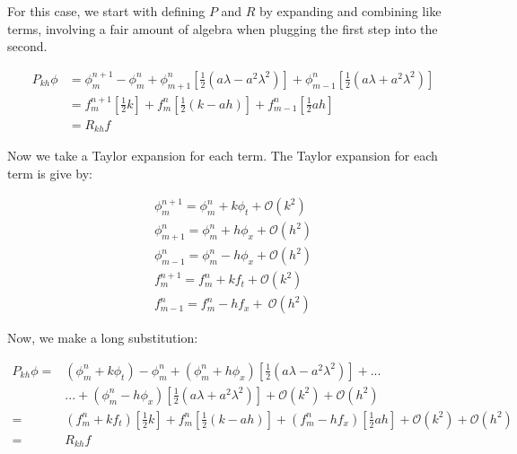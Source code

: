 \documentclass[12pt]{article}
\begin{document}
For this case, we start with defining $P$ and $R$ by expanding and combining like terms, involving a fair amount of algebra when plugging the first step into the second.

\begin{equation*}
    \begin{aligned}
    P_{kh}\phi & = \phi_m^{n+1} - 
    \phi_{m}^{n} + 
    \phi_{m+1}^{n}\left[\frac{1}{2}(a\lambda - a^2\lambda^2 )\right] + 
    \phi_{m-1}^{n}\left[\frac{1}{2}(a\lambda + a^2\lambda^2)\right] \\
     & = f_{m}^{n+1}\left[\frac{1}{2}k\right] +f_{m}^{n}\left[\frac{1}{2}(k-ah)\right] +f_{m-1}^{n}\left[\frac{1}{2}ah\right] \\
     & = R_{kh}f
    \end{aligned}
\end{equation*}

\noindent Now we take a Taylor expansion for each term. The Taylor expansion for each term is give by:

\begin{equation*}
\begin{aligned}
	\phi_m^{n+1} = \phi_m^n + k\phi_t + \mathcal{O}(k^2)\\
	\phi_{m+1}^n = \phi_m^n + h\phi_x + \mathcal{O}(h^2)\\
	\phi_{m-1}^n = \phi_m^n - h\phi_x + \mathcal{O}(h^2)\\
	f_m^{n+1} = f_m^n + kf_t + \mathcal{O}(k^2)\\
	f_{m-1}^n = f_m^n - hf_x + \ \mathcal{O}(h^2)
\end{aligned}
\end{equation*}

\noindent Now, we make a long substitution:

\begin{equation*}
    \begin{aligned}
    P_{kh}\phi = & (\phi_m^n + k\phi_t) - \phi_{m}^{n} + \left(\phi_m^n + h\phi_x  \right)\left[\frac{1}{2}(a\lambda - a^2\lambda^2)\right] +...\\
    &...+\left(\phi_m^n - h\phi_x \right)\left[\frac{1}{2}(a\lambda + a^2\lambda^2)\right] +\mathcal{O}(k^2) + \mathcal{O}(h^2)\\
      = &\left(f_m^n + kf_t \right)\left[\frac{1}{2}k\right] + f_{m}^{n}\left[\frac{1}{2}(k-ah)\right] +\left(f_m^n - hf_x \right)\left[\frac{1}{2}ah\right] + \mathcal{O}(k^2) + \mathcal{O}(h^2)\\
      =& R_{kh}f
    \end{aligned}
\end{equation*}
\end{document}
